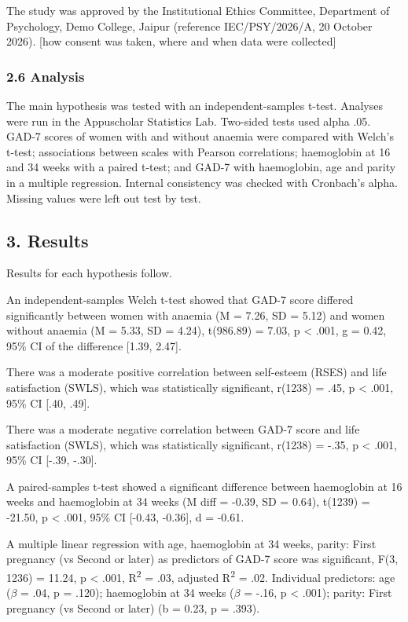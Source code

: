 \documentclass[12pt]{article}
\begin{document}
The study was approved by the Institutional Ethics Committee, Department of Psychology, Demo College, Jaipur (reference IEC/PSY/2026/A, 20 October 2026). [how consent was taken, where and when data were collected]

\subsubsection{2.6 Analysis}

The main hypothesis was tested with an independent-samples t-test. Analyses were run in the Appuscholar Statistics Lab. Two-sided tests used alpha .05. GAD-7 scores of women with and without anaemia were compared with Welch's t-test; associations between scales with Pearson correlations; haemoglobin at 16 and 34 weeks with a paired t-test; and GAD-7 with haemoglobin, age and parity in a multiple regression. Internal consistency was checked with Cronbach's alpha. Missing values were left out test by test.

\subsection{3. Results}

Results for each hypothesis follow.

An independent-samples Welch t-test showed that GAD-7 score differed significantly between women with anaemia (M = 7.26, SD = 5.12) and women without anaemia (M = 5.33, SD = 4.24), t(986.89) = 7.03, p < .001, g = 0.42, 95\% CI of the difference [1.39, 2.47].

There was a moderate positive correlation between self-esteem (RSES) and life satisfaction (SWLS), which was statistically significant, r(1238) = .45, p < .001, 95\% CI [.40, .49].

There was a moderate negative correlation between GAD-7 score and life satisfaction (SWLS), which was statistically significant, r(1238) = -.35, p < .001, 95\% CI [-.39, -.30].

A paired-samples t-test showed a significant difference between haemoglobin at 16 weeks and haemoglobin at 34 weeks (M diff = -0.39, SD = 0.64), t(1239) = -21.50, p < .001, 95\% CI [-0.43, -0.36], d = -0.61.

A multiple linear regression with age, haemoglobin at 34 weeks, parity: First pregnancy (vs Second or later) as predictors of GAD-7 score was significant, F(3, 1236) = 11.24, p < .001, R\textsuperscript{2} = .03, adjusted R\textsuperscript{2} = .02. Individual predictors: age (\ensuremath{\beta} = .04, p = .120); haemoglobin at 34 weeks (\ensuremath{\beta} = -.16, p < .001); parity: First pregnancy (vs Second or later) (b = 0.23, p = .393).
\end{document}
